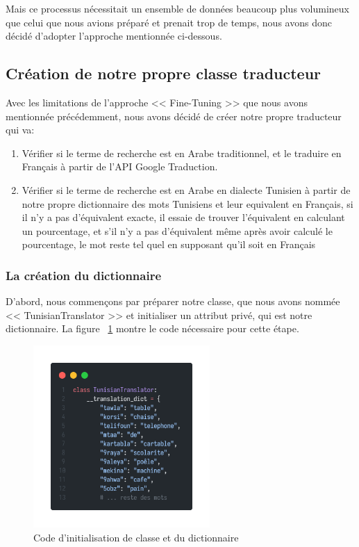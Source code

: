 \noindent
Mais ce processus nécessitait un ensemble de données beaucoup plus volumineux que celui que nous avions préparé et prenait trop de temps, nous avons donc décidé d'adopter l'approche mentionnée ci-dessous.

\newpage
\subsection{Création de notre propre classe traducteur}
\noindent
Avec les limitations de l'approche << Fine-Tuning >> que nous avons mentionnée précédemment, nous avons décidé de créer notre propre traducteur qui va:
\begin{enumerate}
	\item Vérifier si le terme de recherche est en Arabe traditionnel, et le traduire en Français à partir de l'API Google Traduction.
	\item Vérifier si le terme de recherche est en Arabe en dialecte Tunisien à partir de notre propre dictionnaire des mots Tunisiens et leur equivalent en Français, si il n'y a pas d'équivalent exacte, il essaie de trouver l'équivalent en calculant un pourcentage, et s'il n'y a pas d'équivalent même après avoir calculé le pourcentage, le mot reste tel quel en supposant qu'il soit en Français
\end{enumerate}

\subsubsection{La création du dictionnaire}
\noindent
D'abord, nous commençons par préparer notre classe, que nous avons nommée << TunisianTranslator >> et initialiser un attribut privé, qui est notre dictionnaire. La figure ~\ref{fig:dictionary} montre le code nécessaire pour cette étape.

\begin{figure}[H]
	\centering
	\includegraphics[width=0.6\textwidth]{logos/dictionary.png}
	\caption{Code d'initialisation de classe et du dictionnaire}
	\label{fig:dictionary}
\end{figure}

